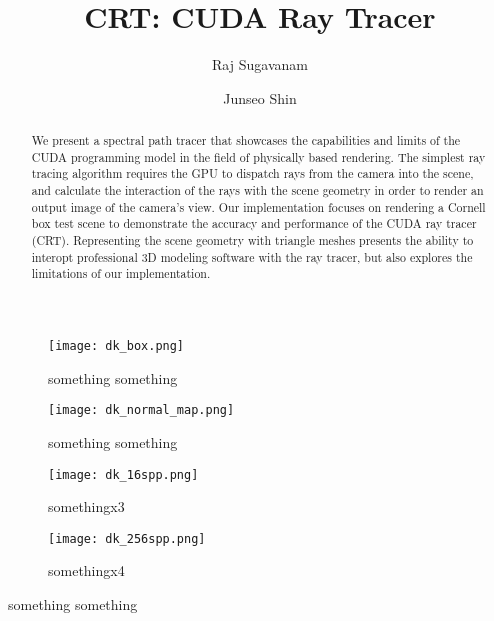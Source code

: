 \documentclass[sigconf, screen]{acmart}
\begin{document}
\title{CRT: CUDA Ray Tracer}

\author{Raj Sugavanam}
\author{Junseo Shin}

\begin{abstract}
    We present a spectral path tracer that showcases the capabilities and limits of the CUDA
    programming model in the field of physically based rendering. The simplest ray tracing
    algorithm requires the GPU to dispatch rays from the camera into the scene, and
    calculate the interaction of the rays with the scene geometry in order to render an output
    image of the camera's view. Our implementation focuses on rendering a Cornell box test scene
    to demonstrate the accuracy and performance of the CUDA ray tracer (CRT). Representing the
    scene geometry with triangle meshes presents the ability to interopt professional 3D modeling
    software with the ray tracer, but also explores the limitations of our implementation.
\end{abstract}

\begin{teaserfigure}
    \centering
    \begin{subfigure}{0.24\textwidth}
        \centering
        \texttt{[image: dk\_box.png]}
        \caption{something something}
        \label{fig:teaser1}
    \end{subfigure}
    \begin{subfigure}{0.24\textwidth}
        \centering
        \texttt{[image: dk\_normal\_map.png]}
        \caption{something something}
        \label{fig:teaser2}
    \end{subfigure}
    \begin{subfigure}{0.24\textwidth}
        \centering
        \texttt{[image: dk\_16spp.png]}
        \caption{somethingx3}
        \label{fig:teaser3}
    \end{subfigure}
    \begin{subfigure}{0.24\textwidth}
        \centering
        \texttt{[image: dk\_256spp.png]}
        \caption{somethingx4}
        \label{fig:teaser4}
    \end{subfigure}
    \caption{something something}
    \label{fig:teaser}
\end{teaserfigure}
\end{document}
